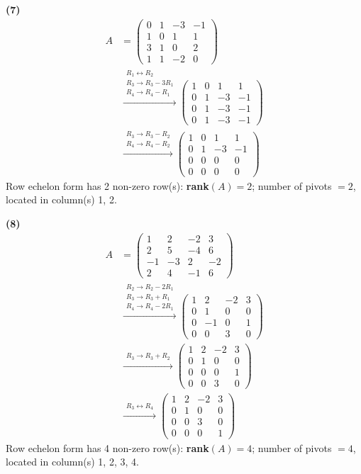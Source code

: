 \noindent\textbf{(7)}
\begin{align*}
A &= \begin{pmatrix}0 & 1 & -3 & -1 \\ 1 & 0 & 1 & 1 \\ 3 & 1 & 0 & 2 \\ 1 & 1 & -2 & 0\end{pmatrix} \\
&\xrightarrow{\substack{R_1\leftrightarrow R_2\\ R_3\to R_3-3R_1\\ R_4\to R_4-R_1}} \begin{pmatrix}1 & 0 & 1 & 1 \\ 0 & 1 & -3 & -1 \\ 0 & 1 & -3 & -1 \\ 0 & 1 & -3 & -1\end{pmatrix} \\
&\xrightarrow{\substack{R_3\to R_3-R_2\\ R_4\to R_4-R_2}} \begin{pmatrix}1 & 0 & 1 & 1 \\ 0 & 1 & -3 & -1 \\ 0 & 0 & 0 & 0 \\ 0 & 0 & 0 & 0\end{pmatrix}
\end{align*}
Row echelon form has 2 non-zero row(s): \textbf{rank}$(A)=2$; number of pivots $=2$, located in column(s) 1, 2.

\noindent\textbf{(8)}
\begin{align*}
A &= \begin{pmatrix}1 & 2 & -2 & 3 \\ 2 & 5 & -4 & 6 \\ -1 & -3 & 2 & -2 \\ 2 & 4 & -1 & 6\end{pmatrix} \\
&\xrightarrow{\substack{R_2\to R_2-2R_1\\ R_3\to R_3+R_1\\ R_4\to R_4-2R_1}} \begin{pmatrix}1 & 2 & -2 & 3 \\ 0 & 1 & 0 & 0 \\ 0 & -1 & 0 & 1 \\ 0 & 0 & 3 & 0\end{pmatrix} \\
&\xrightarrow{\substack{R_3\to R_3+R_2}} \begin{pmatrix}1 & 2 & -2 & 3 \\ 0 & 1 & 0 & 0 \\ 0 & 0 & 0 & 1 \\ 0 & 0 & 3 & 0\end{pmatrix} \\
&\xrightarrow{\substack{R_3\leftrightarrow R_4}} \begin{pmatrix}1 & 2 & -2 & 3 \\ 0 & 1 & 0 & 0 \\ 0 & 0 & 3 & 0 \\ 0 & 0 & 0 & 1\end{pmatrix}
\end{align*}
Row echelon form has 4 non-zero row(s): \textbf{rank}$(A)=4$; number of pivots $=4$, located in column(s) 1, 2, 3, 4.

